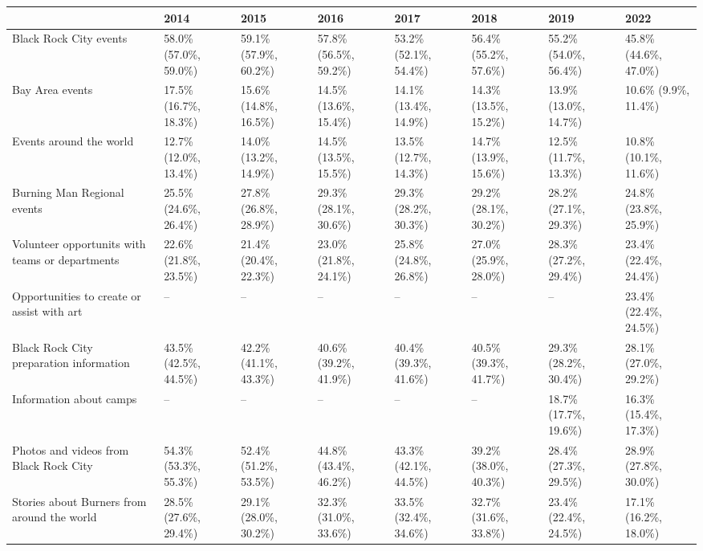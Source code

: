 \documentclass[
]{book}
\begin{document}
\begin{table}
\centering
\begin{tabular}[t]{>{}l|>{}l|>{}l|>{}l|>{}l|>{}l|>{}l|>{}l}
\hline
  & 2014 & 2015 & 2016 & 2017 & 2018 & 2019 & 2022\\
\hline
Black Rock City events & 58.0\% (57.0\%, 59.0\%) & 59.1\% (57.9\%, 60.2\%) & 57.8\% (56.5\%, 59.2\%) & 53.2\% (52.1\%, 54.4\%) & 56.4\% (55.2\%, 57.6\%) & 55.2\% (54.0\%, 56.4\%) & 45.8\% (44.6\%, 47.0\%)\\
\hline
Bay Area events & 17.5\% (16.7\%, 18.3\%) & 15.6\% (14.8\%, 16.5\%) & 14.5\% (13.6\%, 15.4\%) & 14.1\% (13.4\%, 14.9\%) & 14.3\% (13.5\%, 15.2\%) & 13.9\% (13.0\%, 14.7\%) & 10.6\% (9.9\%, 11.4\%)\\
\hline
Events around the world & 12.7\% (12.0\%, 13.4\%) & 14.0\% (13.2\%, 14.9\%) & 14.5\% (13.5\%, 15.5\%) & 13.5\% (12.7\%, 14.3\%) & 14.7\% (13.9\%, 15.6\%) & 12.5\% (11.7\%, 13.3\%) & 10.8\% (10.1\%, 11.6\%)\\
\hline
Burning Man Regional events & 25.5\% (24.6\%, 26.4\%) & 27.8\% (26.8\%, 28.9\%) & 29.3\% (28.1\%, 30.6\%) & 29.3\% (28.2\%, 30.3\%) & 29.2\% (28.1\%, 30.2\%) & 28.2\% (27.1\%, 29.3\%) & 24.8\% (23.8\%, 25.9\%)\\
\hline
Volunteer opportunits with 
 teams or departments & 22.6\% (21.8\%, 23.5\%) & 21.4\% (20.4\%, 22.3\%) & 23.0\% (21.8\%, 24.1\%) & 25.8\% (24.8\%, 26.8\%) & 27.0\% (25.9\%, 28.0\%) & 28.3\% (27.2\%, 29.4\%) & 23.4\% (22.4\%, 24.4\%)\\
\hline
Opportunities to create 
 or assist with art & -- & -- & -- & -- & -- & -- & 23.4\% (22.4\%, 24.5\%)\\
\hline
Black Rock City preparation 
 information & 43.5\% (42.5\%, 44.5\%) & 42.2\% (41.1\%, 43.3\%) & 40.6\% (39.2\%, 41.9\%) & 40.4\% (39.3\%, 41.6\%) & 40.5\% (39.3\%, 41.7\%) & 29.3\% (28.2\%, 30.4\%) & 28.1\% (27.0\%, 29.2\%)\\
\hline
Information about camps & -- & -- & -- & -- & -- & 18.7\% (17.7\%, 19.6\%) & 16.3\% (15.4\%, 17.3\%)\\
\hline
Photos and videos from 
 Black Rock City & 54.3\% (53.3\%, 55.3\%) & 52.4\% (51.2\%, 53.5\%) & 44.8\% (43.4\%, 46.2\%) & 43.3\% (42.1\%, 44.5\%) & 39.2\% (38.0\%, 40.3\%) & 28.4\% (27.3\%, 29.5\%) & 28.9\% (27.8\%, 30.0\%)\\
\hline
Stories about Burners from 
 around the world & 28.5\% (27.6\%, 29.4\%) & 29.1\% (28.0\%, 30.2\%) & 32.3\% (31.0\%, 33.6\%) & 33.5\% (32.4\%, 34.6\%) & 32.7\% (31.6\%, 33.8\%) & 23.4\% (22.4\%, 24.5\%) & 17.1\% (16.2\%, 18.0\%)\\

\end{tabular}
\end{table}
\end{document}
